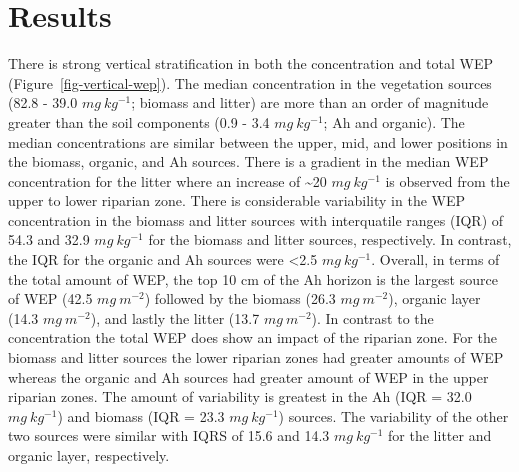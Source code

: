 \documentclass[
]{agujournal2019}
\begin{document}
\section{Results}\label{results}

There is strong vertical stratification in both the concentration and
total WEP (Figure~\ref{fig-vertical-wep}). The median concentration in
the vegetation sources (82.8 - 39.0 \(mg~kg^{-1}\); biomass and litter)
are more than an order of magnitude greater than the soil components
(0.9 - 3.4 \(mg~kg^{-1}\); Ah and organic). The median concentrations
are similar between the upper, mid, and lower positions in the biomass,
organic, and Ah sources. There is a gradient in the median WEP
concentration for the litter where an increase of \textasciitilde20
\(mg~kg^{-1}\) is observed from the upper to lower riparian zone. There
is considerable variability in the WEP concentration in the biomass and
litter sources with interquatile ranges (IQR) of 54.3 and 32.9
\(mg~kg^{-1}\) for the biomass and litter sources, respectively. In
contrast, the IQR for the organic and Ah sources were \textless2.5
\(mg~kg^{-1}\). Overall, in terms of the total amount of WEP, the top 10
cm of the Ah horizon is the largest source of WEP (42.5 \(mg~m^{-2}\))
followed by the biomass (26.3 \(mg~m^{-2}\)), organic layer (14.3
\(mg~m^{-2}\)), and lastly the litter (13.7 \(mg~m^{-2}\)). In contrast
to the concentration the total WEP does show an impact of the riparian
zone. For the biomass and litter sources the lower riparian zones had
greater amounts of WEP whereas the organic and Ah sources had greater
amount of WEP in the upper riparian zones. The amount of variability is
greatest in the Ah (IQR = 32.0 \(mg~kg^{-1}\)) and biomass (IQR = 23.3
\(mg~kg^{-1}\)) sources. The variability of the other two sources were
similar with IQRS of 15.6 and 14.3 \(mg~kg^{-1}\) for the litter and
organic layer, respectively.
\end{document}
